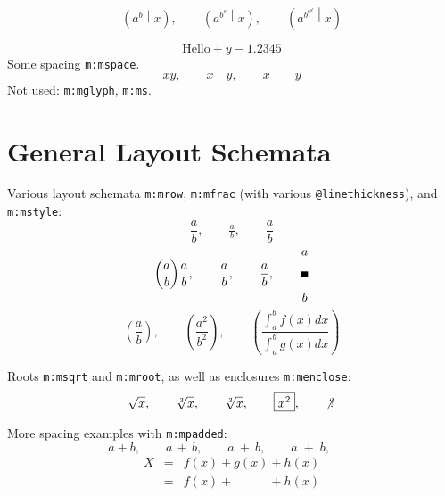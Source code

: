 \documentclass{article}
\makeatletter
\newcommand{\mml}[1]{\texttt{m:#1}}
\newcommand{\attr}[1]{\texttt{@#1}}
\makeatother
\begin{document}
\begin{equation}
\left( a^{b}  \middle| x \right),\qquad
\left( a^{b^{c}} \middle| x \right),\qquad
\left( a^{b^{c^{d}}} \middle| x \right)
\end{equation}

\begin{equation}
 \mbox{Hello} + y - 1.2345
\end{equation}
Some spacing \mml{mspace}.
\begin{equation}
  xy,\qquad
  x \hspace{1em} y,\qquad
  x \hspace{2em} y
\end{equation}
Not used: \mml{mglyph}, \mml{ms}.

\section{General Layout Schemata}
Various layout schemata \mml{mrow}, \mml{mfrac} (with various \attr{linethickness}),
and \mml{mstyle}:
\begin{equation}
 \frac{a}{b},\qquad
 \tfrac{a}{b},\qquad
 \dfrac{a}{b}
\end{equation}
\begin{equation}
 \binom{a}{b}
 \genfrac{}{}{0.0ex}{}{a}{b},\qquad
 \genfrac{}{}{0.01ex}{}{a}{b},\qquad
 \genfrac{}{}{0.1ex}{}{a}{b},\qquad
 \genfrac{}{}{1ex}{}{a}{b}
\end{equation}
\begin{equation}
 \genfrac{(}{)}{}{}{a}{b},\qquad
 \genfrac{(}{)}{}{}{a^2}{b^2},\qquad
 \genfrac{(}{)}{}{}{\int_a^b f(x)dx}{\int_a^b g(x)dx}
\end{equation}

Roots \mml{msqrt} and \mml{mroot}, as well as enclosures \mml{menclose}:
\begin{equation}
 \sqrt{x},\qquad
 \sqrt[3]{x},\qquad
 \root 3 \of {x},\qquad
 \boxed{x^2},\qquad
 \not{?}
\end{equation}


More spacing examples with \mml{mpadded}:
\begin{equation}
  a+b, \qquad
  a \,+\, b, \qquad
  a \>+\> b, \qquad
  a \;+\; b, \qquad
\end{equation}
\begin{eqnarray}
  X &=& f(x) + g(x) + h(x) \\
    &=& f(x) + \phantom{g(x)} + h(x) \\
\end{eqnarray}
\end{document}
